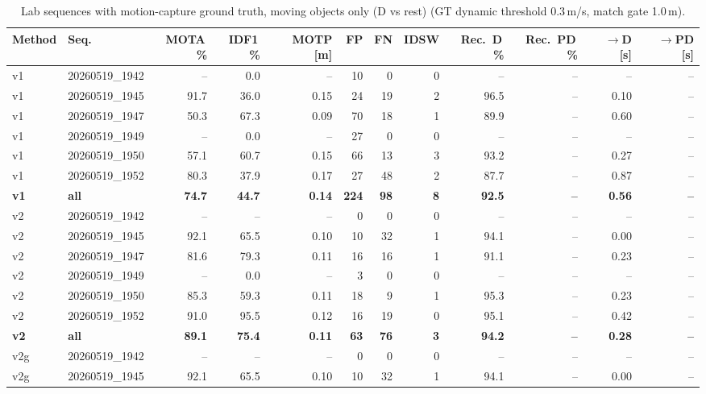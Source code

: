\begin{table}[t]
\centering
\caption{Lab sequences with motion-capture ground truth, moving objects only (D vs rest) (GT dynamic threshold 0.3\,m/s, match gate 1.0\,m).}
\label{tab:own_r8c_dynamic_only}
\setlength{\tabcolsep}{3pt}
\begin{tabular}{llrrrrrrrrrr}
\toprule
Method & Seq. & MOTA\,\% & IDF1\,\% & MOTP [m] & FP & FN & IDSW & Rec.\ D\,\% & Rec.\ PD\,\% & $\to$D [s] & $\to$PD [s] \\
\midrule
v1 & 20260519\_1942 & -- & 0.0 & -- & 10 & 0 & 0 & -- & -- & -- & -- \\
v1 & 20260519\_1945 & 91.7 & 36.0 & 0.15 & 24 & 19 & 2 & 96.5 & -- & 0.10 & -- \\
v1 & 20260519\_1947 & 50.3 & 67.3 & 0.09 & 70 & 18 & 1 & 89.9 & -- & 0.60 & -- \\
v1 & 20260519\_1949 & -- & 0.0 & -- & 27 & 0 & 0 & -- & -- & -- & -- \\
v1 & 20260519\_1950 & 57.1 & 60.7 & 0.15 & 66 & 13 & 3 & 93.2 & -- & 0.27 & -- \\
v1 & 20260519\_1952 & 80.3 & 37.9 & 0.17 & 27 & 48 & 2 & 87.7 & -- & 0.87 & -- \\
\textbf{v1} & \textbf{all} & \textbf{74.7} & \textbf{44.7} & \textbf{0.14} & \textbf{224} & \textbf{98} & \textbf{8} & \textbf{92.5} & \textbf{--} & \textbf{0.56} & \textbf{--} \\
\midrule
v2 & 20260519\_1942 & -- & -- & -- & 0 & 0 & 0 & -- & -- & -- & -- \\
v2 & 20260519\_1945 & 92.1 & 65.5 & 0.10 & 10 & 32 & 1 & 94.1 & -- & 0.00 & -- \\
v2 & 20260519\_1947 & 81.6 & 79.3 & 0.11 & 16 & 16 & 1 & 91.1 & -- & 0.23 & -- \\
v2 & 20260519\_1949 & -- & 0.0 & -- & 3 & 0 & 0 & -- & -- & -- & -- \\
v2 & 20260519\_1950 & 85.3 & 59.3 & 0.11 & 18 & 9 & 1 & 95.3 & -- & 0.23 & -- \\
v2 & 20260519\_1952 & 91.0 & 95.5 & 0.12 & 16 & 19 & 0 & 95.1 & -- & 0.42 & -- \\
\textbf{v2} & \textbf{all} & \textbf{89.1} & \textbf{75.4} & \textbf{0.11} & \textbf{63} & \textbf{76} & \textbf{3} & \textbf{94.2} & \textbf{--} & \textbf{0.28} & \textbf{--} \\
\midrule
v2g & 20260519\_1942 & -- & -- & -- & 0 & 0 & 0 & -- & -- & -- & -- \\
v2g & 20260519\_1945 & 92.1 & 65.5 & 0.10 & 10 & 32 & 1 & 94.1 & -- & 0.00 & -- \\

\end{tabular}
\end{table}
